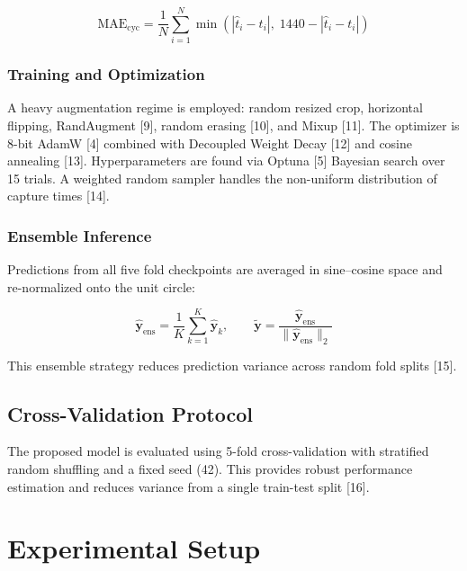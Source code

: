 \documentclass[9pt, a4paper, twocolumn]{article}
\begin{document}
\begin{equation}
\text{MAE}_{\text{cyc}} = \frac{1}{N} \sum_{i=1}^{N}
    \min\!\left(|\hat{t}_i - t_i|,\; 1440 - |\hat{t}_i - t_i|\right)
\end{equation}

\subsubsection{Training and Optimization}

A heavy augmentation regime is employed: random resized crop, horizontal flipping, RandAugment [9], random erasing [10], and Mixup [11]. The optimizer is 8-bit AdamW [4] combined with Decoupled Weight Decay [12] and cosine annealing [13]. Hyperparameters are found via Optuna [5] Bayesian search over 15 trials. A weighted random sampler handles the non-uniform distribution of capture times [14].

\subsubsection{Ensemble Inference}

Predictions from all five fold checkpoints are averaged in sine--cosine space and re-normalized onto the unit circle:

\begin{equation}
\hat{\mathbf{y}}_{\text{ens}} = \frac{1}{K} \sum_{k=1}^{K}
    \hat{\mathbf{y}}_k, \qquad
\tilde{\mathbf{y}} = \frac{\hat{\mathbf{y}}_{\text{ens}}}
    {\|\hat{\mathbf{y}}_{\text{ens}}\|_2}
\end{equation}

This ensemble strategy reduces prediction variance across random fold splits [15].

\subsection{Cross-Validation Protocol}

The proposed model is evaluated using 5-fold cross-validation with stratified random shuffling and a fixed seed (42). This provides robust performance estimation and reduces variance from a single train-test split [16].

\section{Experimental Setup}
\end{document}
